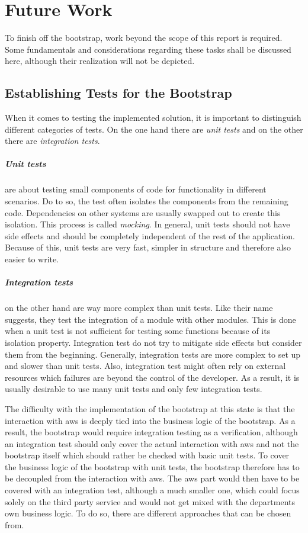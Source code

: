 \chapter{Future Work}
To finish off the bootstrap, work beyond the scope of this report is required.
Some fundamentals and considerations regarding these tasks shall be discussed here, although their realization will not be depicted.

\section{Establishing Tests for the Bootstrap}
When it comes to testing the implemented solution, it is important to distinguish different categories of tests.
On the one hand there are \emph{unit tests} and on the other there are \emph{integration tests}.

\paragraph{Unit tests} are about testing small components of code for functionality in different scenarios.
Do to so, the test often isolates the components from the remaining code.
Dependencies on other systems are usually swapped out to create this isolation.
This process is called \emph{mocking}.
In general, unit tests should not have side effects and should be completely independent of the rest of the application.
Because of this, unit tests are very fast, simpler in structure and therefore also easier to write.

\paragraph{Integration tests} on the other hand are way more complex than unit tests.
Like their name suggests, they test the integration of a module with other modules.
This is done when a unit test is not sufficient for testing some functions because of its isolation property.
Integration test do not try to mitigate side effects but consider them from the beginning.
Generally, integration tests are more complex to set up and slower than unit tests.
Also, integration test might often rely on external resources which failures are beyond the control of the developer.
As a result, it is usually desirable to use many unit tests and only few integration tests.

The difficulty with the implementation of the bootstrap at this state is that the interaction with \ac{aws} is deeply tied into the business logic of the bootstrap.
As a result, the bootstrap would require integration testing as a verification, although an integration test should only cover the actual interaction with \ac{aws} and not the bootstrap itself which should rather be checked with basic unit tests.
To cover the business logic of the bootstrap with unit tests, the bootstrap therefore has to be decoupled from the interaction with \ac{aws}.
The \ac{aws} part would then have to be covered with an integration test, although a much smaller one, which could focus solely on the third party service and would not get mixed with the departments own business logic.
To do so, there are different approaches that can be chosen from.

